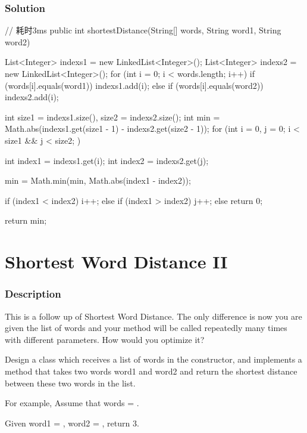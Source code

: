 \subsubsection{Solution}

\begin{Code}
// 耗时3ms
public int shortestDistance(String[] words, String word1, String word2) {
    List<Integer> indexs1 = new LinkedList<Integer>();
    List<Integer> indexs2 = new LinkedList<Integer>();
    for (int i = 0; i < words.length; i++) {
        if (words[i].equals(word1)) {
            indexs1.add(i);
        } else if (words[i].equals(word2)) {
            indexs2.add(i);
        }
    }

    int size1 = indexs1.size(), size2 = indexs2.size();
    int min = Math.abs(indexs1.get(size1 - 1) - indexs2.get(size2 - 1));
    for (int i = 0, j = 0; i < size1 && j < size2; ) {
        int index1 = indexs1.get(i);
        int index2 = indexs2.get(j);

        min = Math.min(min, Math.abs(index1 - index2));

        if (index1 < index2) {
            i++;
        } else if (index1 > index2) {
            j++;
        } else {
            return 0;
        }
    }

    return min;
}
\end{Code}

\newpage

\section{Shortest Word Distance II} %

\subsubsection{Description}
This is a follow up of Shortest Word Distance. The only difference is now you are given the list of words and your method will be called repeatedly many times with different parameters. How would you optimize it?

Design a class which receives a list of words in the constructor, and implements a method that takes two words word1 and word2 and return the shortest distance between these two words in the list.

For example,
Assume that words = .

Given word1 = , word2 = , return 3.

